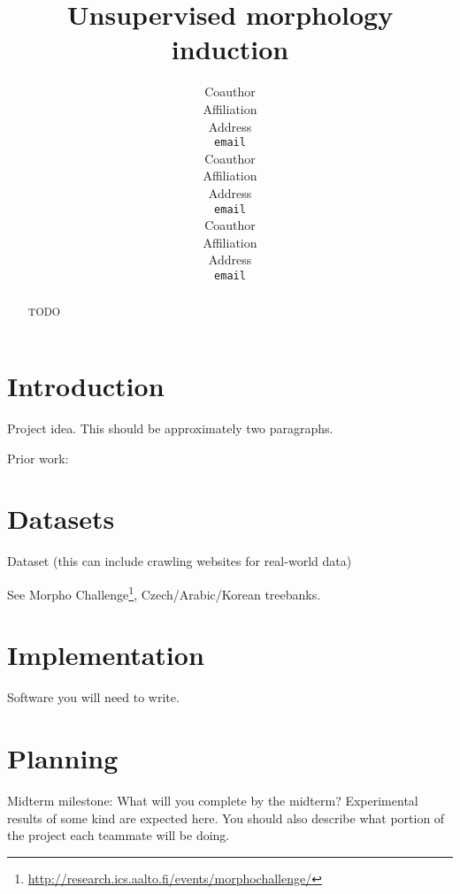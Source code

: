 \documentclass{article}
\title{Unsupervised morphology induction}
\author{
Coauthor \\
Affiliation \\
Address \\
\texttt{email} \\
\And
Coauthor \\
Affiliation \\
Address \\
\texttt{email} \\
\And
Coauthor \\
Affiliation \\
Address \\
\texttt{email}
}
\begin{document}
\maketitle

\begin{abstract}
    TODO
\end{abstract}

\section{Introduction}
Project idea. This should be approximately two paragraphs.

Prior work: \cite{goldwater2011} \cite{dreyer2011} \cite{lee2011}

\section{Datasets}
Dataset (this can include crawling websites for real-world data)

See Morpho Challenge\footnote{\url{http://research.ics.aalto.fi/events/morphochallenge/}}, Czech/Arabic/Korean treebanks.

\section{Implementation}
Software you will need to write.

\section{Planning}
Midterm milestone: What will you complete by the midterm? Experimental results of some kind are expected here. You should also describe what portion of the project each teammate will be doing.



\end{document}
